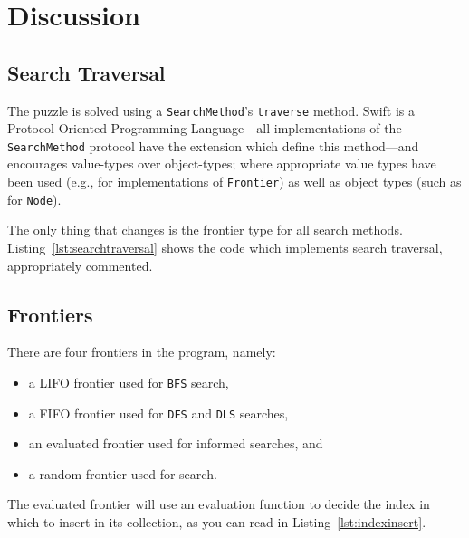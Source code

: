 \section{Discussion}
\label{sec:Discussion}

\subsection{Search Traversal}
\label{sub:Search Traversal}

The puzzle is solved using a \texttt{SearchMethod}'s \texttt{traverse} method.
Swift is a Protocol-Oriented Programming Language—all implementations of the
\texttt{SearchMethod} protocol have the extension which define this method—and
encourages value-types over object-types; where appropriate value types have been
used (e.g., for implementations of \texttt{Frontier}) as well as object types
(such as for \texttt{Node}).

The only thing that changes is the frontier type for all search methods.
Listing~\ref{lst:searchtraversal} shows the code which implements search traversal,
appropriately commented.



\subsection{Frontiers}
\label{sub:Frontiers}

There are four frontiers in the program, namely:

\begin{itemize}
  \item a LIFO frontier used for \texttt{BFS} search,
  \item a FIFO frontier used for \texttt{DFS} and \texttt{DLS} searches,
  \item an evaluated frontier used for informed searches, and
  \item a random frontier used for  search.
\end{itemize}

The evaluated frontier will use an evaluation function to decide the index
in which to insert in its collection, as you can read in Listing~\ref{lst:indexinsert}.



